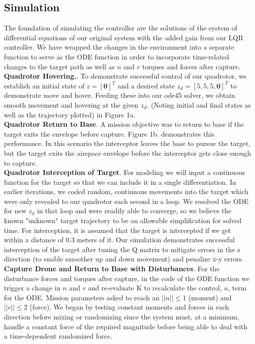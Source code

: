 \documentclass{article}
\begin{document}
\begin{multicols}{2}
\section*{Simulation}
\noindent
The foundation of simulating the controller are the solutions of the system of differential equations of our original system with the added 
gain from our LQR controller.  We have wrapped the changes in the environment into a separate function to serve as the ODE 
function in order to incorporate time-related changes to the target path as well as $n$ and $r$ torques and forces after capture.\\
\textbf{Quadrotor Hovering.}. To demonstrate successful control of our quadrotor, we establish an initial state of $z=[\mathbf{0}]^T$ and 
a desired state $z_d=[5,5,5,\boldsymbol{0}]^T $ to demonstrate move and hover.  Feeding these into our ode45 solver, we obtain 
smooth movement and hovering at the given $z_d$.  (Noting initial and final states as well as the trajectory plotted) in Figure 1a.\\
\textbf{Quadrotor Return to Base}. A mission objective was to return to base if the target exits the envelope before capture.  
Figure 1b. demonstrates this performance. In this scenario the interceptor leaves the base to pursue the target, but the target exits 
the airspace envelope before the interceptor gets close enough to capture.\\
\textbf{Quadrotor Interception of Target}. For modeling we will input a continuous function for the target so that we can include it in a single differentiation.  In earlier iterations, we coded random, continuous movements into the target which were only 
revealed to our quadrotor each second in a loop.  We resolved the ODE for new $z_d$ in that loop and were readily able to converge, so we believe the known "unknown" target trajectory to be an allowable simplification for solved time. For interception, it is assumed that the target is intercepted if we get within a distance of 0.3 meters of it. Our simulation demonstrates successful interception of the target after tuning the Q matrix to mitigate errors in the z direction (to enable smoother up and down 
movement) and penalize x-y errors.  \\
\textbf{Capture Drone and Return to Base  with Disturbances}.  For the disturbance 
forces and torques after capture,  in the code of the ODE function we trigger a 
change in $n$ and $r$ and re-evaluate K  to recalculate the control, $u$, term for the 
ODE.  Mission parameters asked to reach an $||n||\leq1$ (moment) and $||r||\leq2$ (force). We began by testing constant moments and forces in each direction before mixing or randomizing since the system must, at a minimum, handle a constant force of the required magnitude before being able to deal with a time-dependent randomized force.

\end{multicols}
\end{document}
